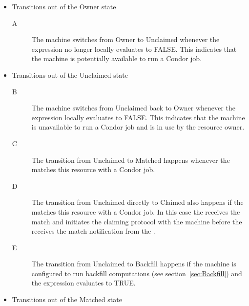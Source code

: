 \begin{itemize}


\item Transitions out of the Owner state

\begin{description}

\item[A] The machine switches from Owner to Unclaimed whenever the
   expression no longer locally evaluates to FALSE.
  This indicates that the machine is potentially available to run a
  Condor job.

\end{description}


\item Transitions out of the Unclaimed state

\begin{description}

\item[B] The machine switches from Unclaimed back to Owner whenever the
   expression locally evaluates to FALSE.
  This indicates that the machine is unavailable to run a Condor job
  and is in use by the resource owner.

\item[C] The transition from Unclaimed to Matched happens whenever the
   matches this resource with a Condor job.

\item[D] The transition from Unclaimed directly to Claimed also happens
  if the  matches this resource with a Condor job.
  In this case the  receives the match and initiates
  the claiming protocol with the machine before the 
  receives the match notification from the .

\item[E] The transition from Unclaimed to Backfill happens if the
  machine is configured to run backfill computations (see
  section~\ref{sec:Backfill}) and the 
  expression evaluates to TRUE.

\end{description}


\item Transitions out of the Matched state

\begin{description}


\end{description}
\end{itemize}
